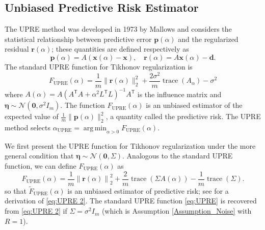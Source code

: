 \documentclass[12pt]{article}
\newcommand{\mA}{m}	%
\newcommand{\dVec}{\mathbf{d}}	%
\newcommand{\pVec}{\mathbf{p}}	%
\newcommand{\rVec}{\mathbf{r}}	%
\newcommand{\xVec}{\mathbf{x}}	%
\newcommand{\trans}[1]{{#1}^\mathsf{T}}	%
\DeclareMathOperator{\trace}{trace}		%
\newcommand{\regparam}{\alpha}  %
\newcommand{\xReg}{\xVec(\regparam)}	%
\newcommand{\xSol}{\xVec}	%
\DeclareMathOperator*{\argmin}{arg\,min}
\newcommand{\noise}{\eta}	%
\newcommand{\noiseSD}{\sigma}	%
\newcommand{\noiseVec}{\bm{\noise}}	%
\newcommand{\A}{A(\regparam)}	%
\newcommand{\U}{F_{\text{UPRE}}}	%
\newcommand{\UBig}{\widetilde{F}_{\text{UPRE}}}	%
\begin{document}
\subsection{Unbiased Predictive Risk Estimator} \label{sec:UPRE}
The UPRE method was developed in 1973 by Mallows and considers the statistical relationship between predictive error $\pVec(\regparam)$ and the regularized residual $\rVec(\regparam)$; these quantities are defined respectively as
\begin{equation}
\label{eq:Predictive Error and Regularized Residual}
\pVec(\regparam) = A(\xReg - \xSol), \quad \rVec(\regparam) = A\xReg - \dVec.
\end{equation}
The standard UPRE function for Tikhonov regularization is
\begin{equation}
\label{eq:UPRE}
\U(\alpha) = \frac{1}{\mA}\|\rVec(\regparam)\|_2^2 + \frac{2\noiseSD^2}{\mA}\trace(A_\regparam) - \noiseSD^2
\end{equation}
where $\A = A(\trans{A}A + \regparam^2\trans{L}L)^{-1}\trans{A}$ is the influence matrix and $\noiseVec \sim \mathcal{N}(\bm{0},\noiseSD^2 I_{\mA})$. The function $\U(\regparam)$ is an unbiased estimator of the expected value of $\frac{1}{\mA}\|\pVec(\regparam)\|_2^2$, a quantity called the predictive risk. The UPRE method selects $\regparam_{\textrm{UPRE}} = \argmin_{\regparam > 0} \U(\regparam)$. \par
We first present the UPRE function for Tikhonov regularization under the more general condition that $\noiseVec \sim \mathcal{N}(\bm{0},\Sigma)$. Analogous to the standard UPRE function, we can define $\U(\regparam)$ as
\begin{equation}
\label{eq:UPRE 2}
\U(\regparam) = \frac{1}{\mA}\left\|\rVec(\regparam)\right\|_2^2 + \frac{2}{\mA}\trace\left(\Sigma\A\right) - \frac{1}{\mA}\trace\left(\Sigma\right).
\end{equation}
so that $\UBig(\regparam)$ is an unbiased estimator of predictive risk; see \cite{Byrne} for a derivation of \eqref{eq:UPRE 2}. The standard UPRE function \eqref{eq:UPRE} is recovered from \eqref{eq:UPRE 2} if $\Sigma = \noiseSD^2 I_{\mA}$ (which is Assumption \ref{Assumption_Noise} with $R = 1$).
\end{document}
